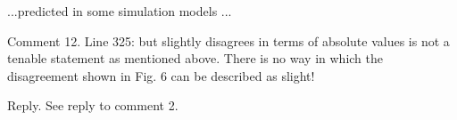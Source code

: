 \documentclass[page-classic]{epl2}
\begin{document}
\vspace{0.5 cm}

...predicted in some  simulation models
\cite{NEST}...

\vspace{0.5 cm}

Comment 12. Line 325: but slightly disagrees in terms of absolute
values is not a tenable statement as mentioned above.  There is no
way in which the disagreement shown in Fig. 6 can be described as
slight!

\vspace{0.5 cm}

Reply. See reply to comment 2.

\vspace{0.5 cm}
\end{document}
